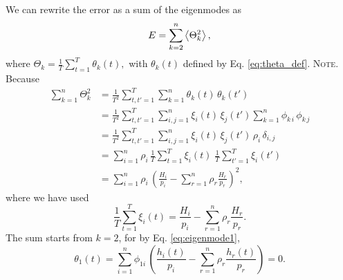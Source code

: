 \documentclass[reprint, floatfix]{revtex4-1}
\newcommand{\note}[1]{{\color{DarkGreen}\footnotesize \textsc{Note.} #1}}
\begin{document}
We can rewrite the error as
a sum of the eigenmodes as
%
\begin{align}
  E
  =
  \sum_{ k = 2 }^n
    \left\langle
      \Theta_k^2
    \right\rangle
  ,
\notag
\end{align}
%
where
%
$
  \Theta_k
  =
  \frac{ 1 } { T }
  \sum_{ t = 1 } ^ T
    \theta_k( t )
  ,
$
%
with $\theta_k(t)$ defined by Eq. \eqref{eq:theta_def}.
%
\note{Because
%
\begin{align*}
  \sum_{ k = 1 }^n
    \Theta_k^2
  &=
  \frac{ 1 } { T^2 }
  \sum_{ t, t' = 1 }^T
    \sum_{ k = 1 }^n
      \theta_k( t ) \, \theta_k( t' )
  \\
  &=
  \frac{ 1 } { T^2 }
  \sum_{ t, t' = 1 }^T
    \sum_{ i, j = 1 }^n
      \xi_i(t) \, \xi_j(t')
      \sum_{ k = 1 }^n
        \phi_{k \, i} \, \phi_{k \, j}
  \\
  &=
  \frac{ 1 } { T^2 }
  \sum_{ t, t' = 1 }^T
    \sum_{ i, j = 1 }^n
      \xi_i(t) \, \xi_j(t') \,
      \rho_i \, \delta_{i, j}
  \\
  &=
  \sum_{ i = 1 }^n
  \rho_i \,
  \frac{ 1 } { T }
  \sum_{ t = 1 }^T \xi_i(t)
  \;
  \frac{ 1 } { T }
  \sum_{ t' = 1 }^T \xi_i(t')
  \\
  &=
  \sum_{ i = 1 }^n
    \rho_i \,
      \left(
        \frac{ H_i }
             { p_i }
        -
        \sum_{r = 1}^n \rho_r
        \frac{ H_r }
             { p_r }
      \right)^2
  ,
\end{align*}
where we have used
$$
  \frac{1}{T}
  \sum_{t = 1}^T \xi_i(t)
  =
  \frac{ H_i }
       { p_i }
  -
  \sum_{r = 1}^n \rho_r
  \frac{ H_r }
       { p_r }
  .
$$
}%
The sum starts from $k = 2$, for
by Eq. \eqref{eq:eigenmode1}, %
$$
\theta_1(t)
=
\sum_{ i = 1 }^n
  \phi_{1i} \, \left(
    \frac{ h_i(t) } { p_i }
    -
    \sum_{r = 1}^n
    \rho_r
    \frac{ h_r(t) } { p_r }
  \right)
= 0.
$$
\end{document}
